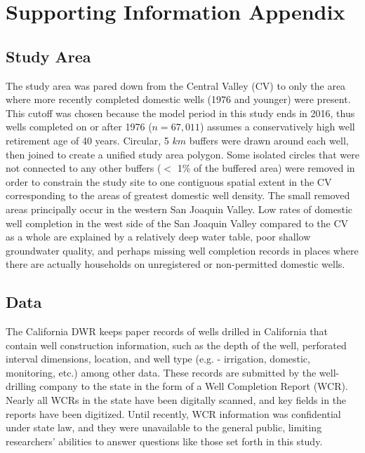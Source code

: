 \section{Supporting Information Appendix} \label{ap_a_dom_wells}

\subsection{Study Area}
\label{ap_a_study_area}

The study area was pared down from the Central Valley (CV) to only the area where more recently completed domestic wells (1976 and younger) were present. This cutoff was chosen because the model period in this study ends in 2016, thus wells completed on or after 1976 ($n = 67,011$) assumes a conservatively high well retirement age of 40 years. Circular, 5 $km$ buffers were drawn around each well, then joined to create a unified study area polygon. Some isolated circles that were not connected to any other buffers ($<$ 1\% of the buffered area) were removed in order to constrain the study site to one contiguous spatial extent in the CV corresponding to the areas of greatest domestic well density. The small removed areas principally occur in the western San Joaquin Valley. Low rates of domestic well completion in the west side of the San Joaquin Valley compared to the CV as a whole are explained by a relatively deep water table, poor shallow groundwater quality, and perhaps missing well completion records in places where there are actually households on unregistered or non-permitted domestic wells. 


\subsection{Data}
\label{ap_a_data}

The California DWR keeps paper records of wells drilled in California that contain well construction information, such as the depth of the well, perforated interval dimensions, location, and well type (e.g. - irrigation, domestic, monitoring, etc.) among other data. These records are submitted by the well-drilling company to the state in the form of a Well Completion Report (WCR). Nearly all WCRs in the state have been digitally scanned, and key fields in the reports have been digitized. Until recently, WCR information was confidential under state law, and they were unavailable to the general public, limiting researchers' abilities to answer questions like those set forth in this study.

